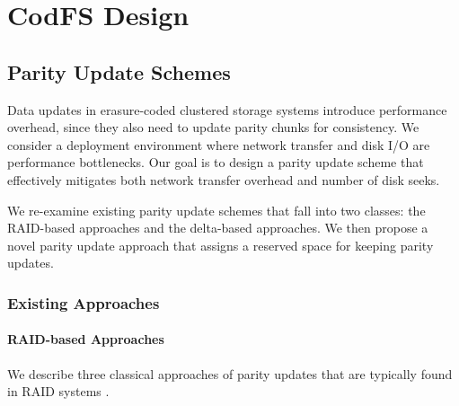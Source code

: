 \chapter{CodFS Design}

\section{Parity Update Schemes}
\label{sec:parity}

Data updates in erasure-coded clustered storage systems introduce performance
overhead, since they also need to update parity chunks for consistency.  We
consider a deployment environment where network transfer and disk I/O are
performance bottlenecks.  Our goal is to design a parity update scheme that
effectively mitigates both network transfer overhead and number of disk seeks.


We re-examine existing parity update schemes
that fall into two classes: the RAID-based approaches and the delta-based
approaches. 
We then propose a novel parity update approach that assigns a reserved space
for keeping parity updates. 

\subsection{Existing Approaches}

\subsubsection{RAID-based Approaches}

We describe three classical approaches of parity updates that are typically
found in RAID systems \cite{chen95,thomasian05}. 

